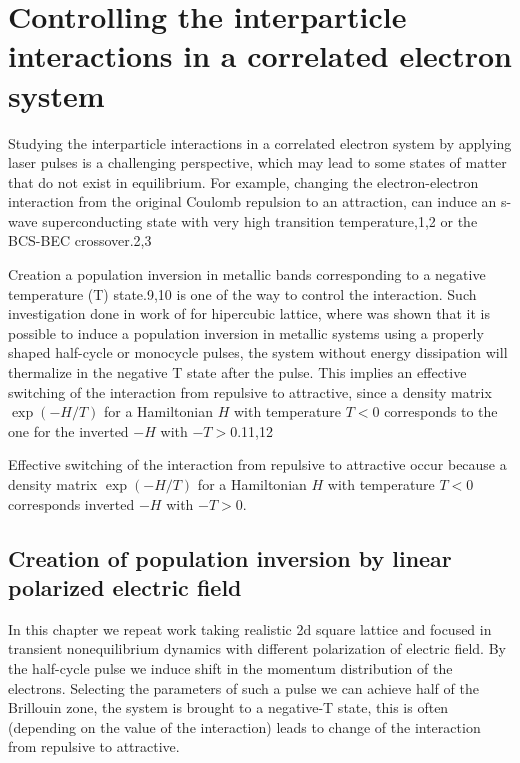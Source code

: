 \tableofcontents

\section{Controlling the interparticle interactions in a correlated electron system}

Studying the interparticle interactions in a correlated electron system by applying laser pulses is a challenging perspective, which may lead to some states of matter that do not exist in equilibrium. For example, changing the electron-electron interaction from the original Coulomb repulsion to an attraction, can induce an s-wave superconducting state with very high transition temperature,1,2 or the BCS-BEC crossover.2,3

Creation a population inversion in metallic bands corresponding to a negative temperature (T) state.9,10 is one of the way to control the interaction. Such investigation done in work of \citet{PhysRevB.85.155124} for hipercubic lattice, where was shown that it is possible to induce a population inversion in metallic systems using a properly shaped  half-cycle or monocycle pulses, the system without energy dissipation will thermalize in the negative T state after the pulse. This implies an effective switching of the interaction from repulsive to attractive, since a density matrix $\exp(-H/T)$ for a Hamiltonian $H$ with temperature $T < 0$ corresponds to the one for the inverted $-H$ with $-T > 0$.11,12 

Effective switching of the interaction from repulsive to attractive occur because a density matrix $\exp({-H/T})$ for a Hamiltonian $H$ with temperature $T < 0$ corresponds inverted $-H$ with $-T > 0$.

\subsection{Creation of population inversion by linear polarized electric field}


In this chapter we repeat work \citet{PhysRevB.85.155124} taking realistic 2d square lattice and focused in transient nonequilibrium dynamics with different polarization of electric field.
By the half-cycle pulse we induce shift in the momentum distribution of the electrons. Selecting the parameters of such a pulse we can achieve half of the Brillouin zone, the system is brought to a negative-T state, this is often (depending on the value of the interaction) leads to change of the interaction from repulsive to attractive.

